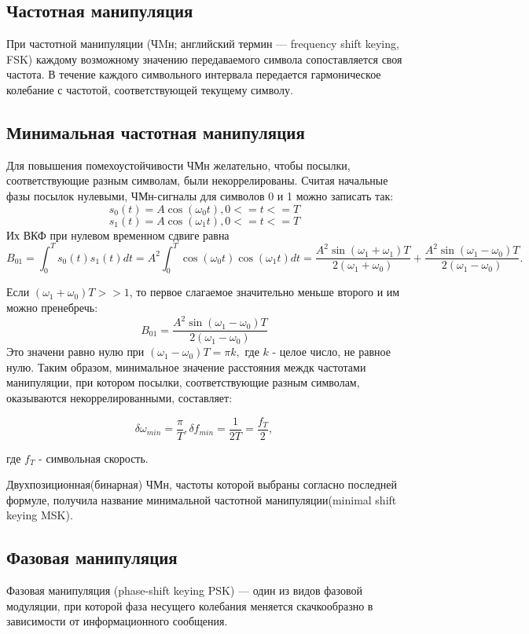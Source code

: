 \subsection{Частотная манипуляция}
При частотной манипуляции (ЧMн; английский термин — frequency shift keying, FSK) каждому возможному значению передаваемого символа сопоставляется своя частота. В течение каждого символьного интервала передается гармоническое колебание с частотой, соответствующей текущему символу.

\subsection{Минимальная частотная манипуляция}
Для повышения помехоустойчивости ЧМн желательно, чтобы посылки, соответствующие разным символам, были некоррелированы. Считая начальные фазы посылок нулевыми, ЧМн-сигналы для символов 0 и 1 можно записать так: 
$$ s_0(t) = A \cos(\omega_0 t), 0 <= t <= T $$
$$ s_1(t) = A \cos(\omega_1 t), 0 <= t <= T $$
Их ВКФ при нулевом временном сдвиге равна
$$ B_{01} = \int_{0}^{T} s_0(t)s_1(t)dt = A^2 \int_{0}^{T} \cos( \omega_0 t ) \cos( \omega_1 t)dt =
\frac{A^2 \sin(\omega_1 + \omega_1)T}{2(\omega_1 + \omega_0)} + \frac{A^2 \sin(\omega_1 - \omega_0)T}{2(\omega_1 - \omega_0)}. $$
 
Если $ (\omega_1 + \omega_0)T >> 1 $, то первое слагаемое значительно меньше второго и им можно пренебречь:
$$ B_{01} = \frac{A^2 \sin(\omega_1 - \omega_0) T}{2(\omega_1 - \omega_0)} $$
Это значени равно нулю при $ (\omega_1 - \omega_0)T = \pi k, $ где $k$ - целое число, не равное нулю.
Таким образом, минимальное значение расстояния междк частотами манипуляции, при котором посылки, соответствующие разным символам, оказываются некоррелированными, составляет:

$$ \delta \omega_{min} = \frac{\pi}{T}, \delta f_{min} = \frac{1}{2T} = \frac{f_T}{2}, $$

где $ f_T $ - символьная скорость.

Двухпозиционная(бинарная) ЧМн, частоты которой выбраны согласно последней формуле, получила
название минимальной частотной манипуляции(minimal shift keying MSK).  


\subsection{Фазовая манипуляция}

Фазовая манипуляция (phase-shift keying PSK) — один из видов фазовой модуляции, при которой фаза несущего колебания меняется скачкообразно в зависимости от информационного сообщения.

